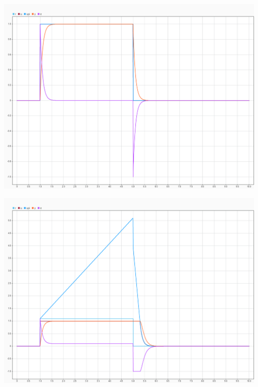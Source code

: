 \vspace{0.2cm}
\begin{minipage}[c]{0.4\columnwidth}
    \begin{center}
    \end{center}
    \vspace{-0.2cm}
    \includegraphics[width=\columnwidth]{images/windup_beispiel_plot_normal.png}
\end{minipage}
\hfill
\begin{minipage}[c]{0.4\columnwidth}
    \begin{center}
    \end{center}
    \vspace{-0.2cm}
    \includegraphics[width=\columnwidth]{images/windup_beispiel_plot_windup_effekt.png}
\end{minipage}


